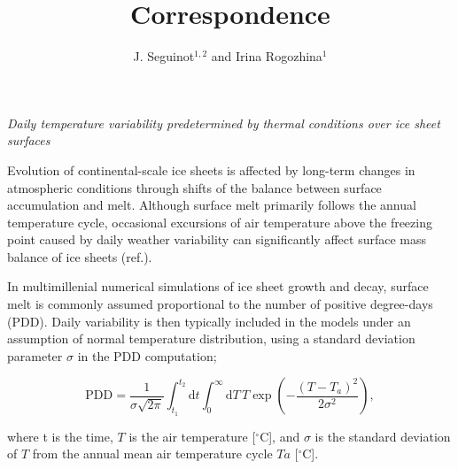 \documentclass[review]{igs}
\begin{document}
\title[Correspondence]{Correspondence}
\author[J. Seguinot and I. Rogozhina]{J. Seguinot$^{1,2}$ and Irina Rogozhina$^1$}

\maketitle


\emph{Daily temperature variability predetermined by thermal conditions over ice sheet surfaces}

Evolution of continental-scale ice sheets is affected by long-term changes in atmospheric conditions through shifts of the balance between surface accumulation and melt. Although surface melt primarily follows the annual temperature cycle, occasional excursions of air temperature above the freezing point caused by daily weather variability can significantly affect surface mass balance of ice sheets (ref.).

In multimillenial numerical simulations of ice sheet growth and decay, surface melt is commonly assumed proportional to the number of positive degree-days (PDD). Daily variability is then typically included in the models under an assumption of normal temperature distribution, using a standard deviation parameter $\sigma$ in the PDD computation;

\begin{equation} \label{eq:reeh}
  \mathrm{PDD} = \frac{1}{\sigma\sqrt{2\pi}}
    \int_{t_1}^{t_2} \mathrm{d}t
    \int_{0}^{\infty} \mathrm{d}T \,
    T \exp\left({-\frac{(T-T_a)^2}{2\sigma^2}}\right),
\end{equation}

where t is the time, $T$ is the air temperature [$^\circ$C], and $\sigma$ is the standard deviation of $T$ from the annual mean air temperature cycle $Ta$ [$^\circ$C].
\end{document}
